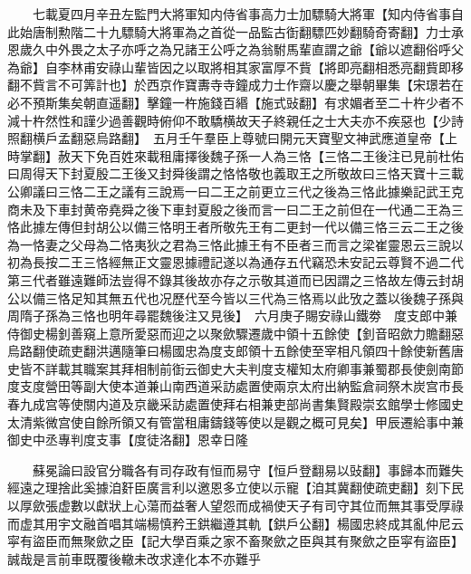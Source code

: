　　七載夏四月辛丑左監門大將軍知内侍省事高力士加驃騎大將軍【知内侍省事自此始唐制勲階二十九驃騎大將軍為之首從一品監古衘翻驃匹妙翻騎奇寄翻】力士承恩歲久中外畏之太子亦呼之為兄諸王公呼之為翁駙馬輩直謂之爺【爺以遮翻俗呼父為爺】自李林甫安祿山輩皆因之以取將相其家富厚不貲【將即亮翻相悉亮翻貲即移翻不貲言不可筭計也】於西京作寶夀寺寺鐘成力士作齋以慶之舉朝畢集【宋璟若在必不預斯集矣朝直遥翻】擊鐘一杵施錢百緡【施式䜴翻】有求媚者至二十杵少者不減十杵然性和謹少過善觀時俯仰不敢驕横故天子終親任之士大夫亦不疾惡也【少詩照翻横戶孟翻惡烏路翻】　五月壬午羣臣上尊號曰開元天寶聖文神武應道皇帝【上時掌翻】赦天下免百姓來載租庸擇後魏子孫一人為三恪【三恪二王後注已見前杜佑曰周得天下封夏殷二王後又封舜後謂之恪恪敬也義取王之所敬故曰三恪天寶十三載公卿議曰三恪二王之議有三說焉一曰二王之前更立三代之後為三恪此據樂記武王克商未及下車封黄帝堯舜之後下車封夏殷之後而言一曰二王之前但在一代通二王為三恪此據左傳但封胡公以備三恪明王者所敬先王有二更封一代以備三恪三云二王之後為一恪妻之父母為二恪夷狄之君為三恪此據王有不臣者三而言之梁崔靈恩云三說以初為長按二王三恪經無正文靈恩據禮記遂以為通存五代竊恐未安記云尊賢不過二代第三代者雖遠難師法豈得不錄其後故亦存之示敬其道而已因謂之三恪故左傳云封胡公以備三恪足知其無五代也况歷代至今皆以三代為三恪焉以此攷之蓋以後魏子孫與周隋子孫為三恪也明年尋罷魏後注又見後】　六月庚子賜安祿山鐵劵　度支郎中兼侍御史楊釗善窺上意所愛惡而迎之以聚歛驟遷歲中領十五餘使【釗音昭歛力贍翻惡烏路翻使疏吏翻洪邁隨筆曰楊國忠為度支郎領十五餘使至宰相凡領四十餘使新舊唐史皆不詳載其職案其拜相制前衘云御史大夫判度支權知太府卿事兼蜀郡長使劍南節度支度營田等副大使本道兼山南西道采訪處置使兩京太府出納監倉祠祭木炭宫市長春九成宫等使關内道及京畿采訪處置使拜右相兼吏部尚書集賢殿崇玄館學士修國史太清紫微宫使自餘所領又有管當租庸鑄錢等使以是觀之概可見矣】甲辰遷給事中兼御史中丞專判度支事【度徒洛翻】恩幸日隆

　　蘇冕論曰設官分職各有司存政有恒而易守【恒戶登翻易以䜴翻】事歸本而難失經遠之理捨此奚據洎姧臣廣言利以邀恩多立使以示寵【洎其冀翻使疏吏翻】刻下民以厚歛張虚數以獻狀上心蕩而益奢人望怨而成禍使天子有司守其位而無其事受厚祿而虚其用宇文融首唱其端楊慎矜王鉷繼遵其軌【鉷戶公翻】楊國忠終成其亂仲尼云寜有盜臣而無聚歛之臣【記大學百乘之家不畜聚歛之臣與其有聚歛之臣寜有盜臣】誠哉是言前車既覆後轍未改求達化本不亦難乎


